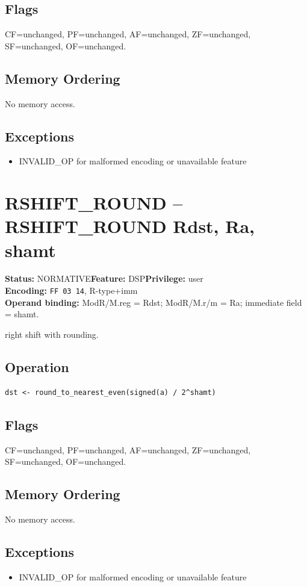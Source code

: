 \documentclass[10pt]{article}
\begin{document}
\subsection*{Flags}
CF=unchanged, PF=unchanged, AF=unchanged, ZF=unchanged, SF=unchanged, OF=unchanged.
\subsection*{Memory Ordering}
No memory access.
\subsection*{Exceptions}
\begin{itemize}
\item INVALID\_OP for malformed encoding or unavailable feature
\end{itemize}
\clearpage

\section{RSHIFT\_ROUND -- RSHIFT\_ROUND Rdst, Ra, shamt}
\textbf{Status:} NORMATIVE\quad \textbf{Feature:} DSP\quad \textbf{Privilege:} user\\
\textbf{Encoding:} \texttt{FF 03 14}, R-type+imm\\
\textbf{Operand binding:} ModR/M.reg = Rdst; ModR/M.r/m = Ra; immediate field = shamt.

right shift with rounding.

\subsection*{Operation}
\begin{lstlisting}
dst <- round_to_nearest_even(signed(a) / 2^shamt)
\end{lstlisting}
\subsection*{Flags}
CF=unchanged, PF=unchanged, AF=unchanged, ZF=unchanged, SF=unchanged, OF=unchanged.
\subsection*{Memory Ordering}
No memory access.
\subsection*{Exceptions}
\begin{itemize}
\item INVALID\_OP for malformed encoding or unavailable feature
\end{itemize}
\clearpage
\end{document}
